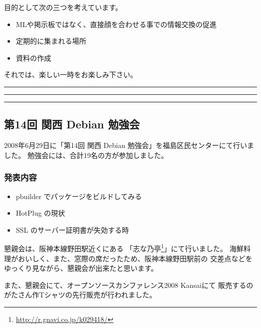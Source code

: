 \documentclass[mingoth,a4paper]{jsarticle}
\begin{document}
 目的として次の三つを考えています。
 \begin{itemize}
  \item MLや掲示板ではなく、直接顔を合わせる事での情報交換の促進
  \item 定期的に集まれる場所
  \item 資料の作成
 \end{itemize}

 それでは、楽しい一時をお楽しみ下さい。

\newpage

\begin{minipage}[b]{0.2\hsize}
 {}
\end{minipage}
\begin{minipage}[b]{0.8\hsize}
\hrule
\vspace{2mm}
\hrule
\setcounter{tocdepth}{1}
\tableofcontents
\vspace{2mm}
\hrule
\end{minipage}


\subsection{第14回 関西 Debian 勉強会}

2008年6月29日に「第14回 関西 Debian 勉強会」を福島区民センターにて行いました。
勉強会には、合計19名の方が参加しました。

\subsubsection{発表内容}

\begin{itemize}
 \item pbuilder でパッケージをビルドしてみる
 \item HotPlug の現状
 \item SSL のサーバー証明書が失効する時
\end{itemize}

懇親会は、阪神本線野田駅近くにある
「志な乃亭\footnote{\url{http://r.gnavi.co.jp/k029418/}}」にて行いました。
海鮮料理がおいしく、また、窓際の席だったため、阪神本線野田駅前の
交差点などをゆっくり見ながら、懇親会が出来たと思います。

また、懇親会にて、オープンソースカンファレンス2008 Kansaiにて
販売するのがたさん作Tシャツの先行販売が行われました。
\end{document}
